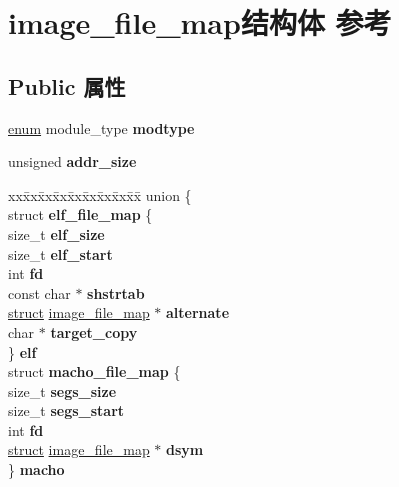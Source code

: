 \hypertarget{structimage__file__map}{}\section{image\+\_\+file\+\_\+map结构体 参考}
\label{structimage__file__map}
\subsection*{Public 属性}
\begin{DoxyCompactItemize}
\item 
\mbox{\label{structimage__file__map_a41d799919c531b419cfa9a0df24caaf5}} 
\hyperlink{interfaceenum}{enum} module\+\_\+type {\bfseries modtype}
\item 
\mbox{\label{structimage__file__map_a9d015a69f26ef6b3c09a2aa73cbd2dc6}} 
unsigned {\bfseries addr\+\_\+size}
\item 
\mbox{\label{structimage__file__map_a3a006cfc738e37f653f0e292ca6e5234}} 
\begin{tabbing}
xx\=xx\=xx\=xx\=xx\=xx\=xx\=xx\=xx\=\kill
union \{\\
\>struct {\bfseries elf\_file\_map} \{\\
\>\>size\_t {\bfseries elf\_size}\\
\>\>size\_t {\bfseries elf\_start}\\
\>\>int {\bfseries fd}\\
\>\>const char $\ast$ {\bfseries shstrtab}\\
\>\>\hyperlink{interfacestruct}{struct} \hyperlink{structimage__file__map}{image\_file\_map} $\ast$ {\bfseries alternate}\\
\>\>char $\ast$ {\bfseries target\_copy}\\
\>\} {\bfseries elf}\\
\>struct {\bfseries macho\_file\_map} \{\\
\>\>size\_t {\bfseries segs\_size}\\
\>\>size\_t {\bfseries segs\_start}\\
\>\>int {\bfseries fd}\\
\>\>\hyperlink{interfacestruct}{struct} \hyperlink{structimage__file__map}{image\_file\_map} $\ast$ {\bfseries dsym}\\
\>\} {\bfseries macho}\\

\end{tabbing}
\end{DoxyCompactItemize}
